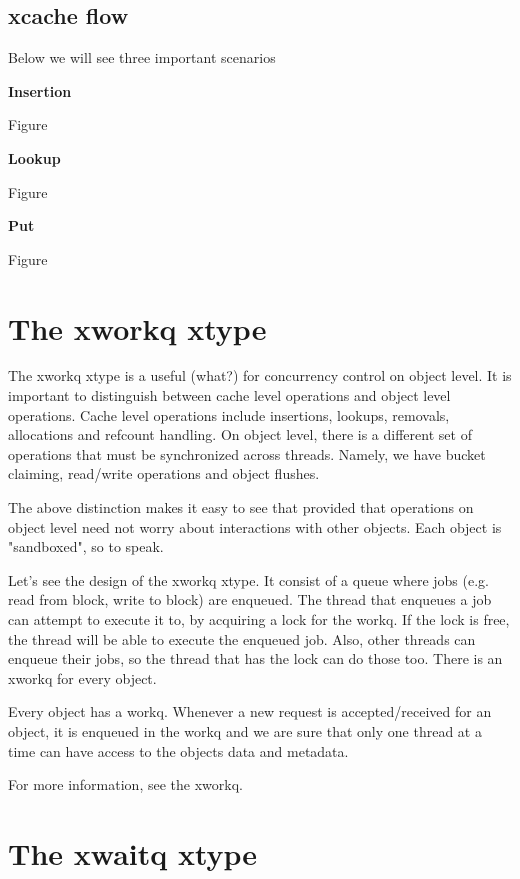 \subsection{xcache flow}

Below we will see three important scenarios

\textbf{Insertion}

Figure

\textbf{Lookup}

Figure

\textbf{Put}

Figure

\section{The xworkq xtype}

The xworkq xtype is a useful (what?) for concurrency control on object level. It 
is important to distinguish between cache level operations and object level 
operations. Cache level operations include insertions, lookups, removals, 
allocations and refcount handling. On object level, there is a different set of 
operations that must be synchronized across threads. Namely, we have bucket 
claiming, read/write operations and object flushes.

Τhe above distinction makes it easy to see that provided that operations on 
object level need not worry about interactions with other objects. Each object 
is "sandboxed", so to speak.

Let's see the design of the xworkq xtype. It consist of a queue where jobs (e.g.  
read from block, write to block) are enqueued. The thread that enqueues a job 
can attempt to execute it to, by acquiring a lock for the workq. If the lock is 
free, the thread will be able to execute the enqueued job. Also, other threads 
can enqueue their jobs, so the thread that has the lock can do those too. There 
is an xworkq for every object.

Every object has a workq. Whenever a new request is accepted/received for an
object, it is enqueued in the workq and we are sure that only one thread at a
time can have access to the objects data and metadata.

For more information, see the xworkq.

\section{The xwaitq xtype}

